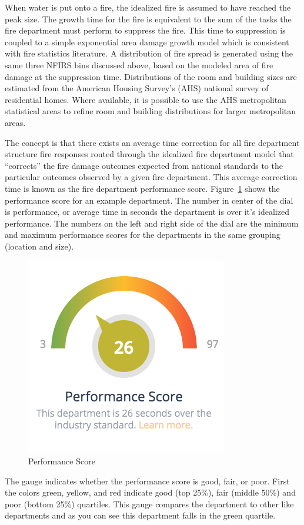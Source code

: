 \documentclass[12pt,oneside]{book}
\begin{document}
When water is put onto a fire, the idealized fire is assumed to have reached the peak size. The growth time for the fire is equivalent to the sum of the tasks the fire department must perform to suppress the fire. This time to suppression is coupled to a simple exponential area damage growth model which is consistent with fire statistics literature. A distribution of fire spread is generated using the same three NFIRS bins discussed above, based on the modeled area of fire damage at the suppression time. Distributions of the room and building sizes are estimated from the American Housing Survey's (AHS) national survey of residential homes. Where available, it is possible to use the AHS metropolitan statistical areas to refine room and building distributions for larger metropolitan areas.

The concept is that there exists an average time correction for all fire department structure fire responses routed through the idealized fire department model that ``corrects'' the fire damage outcomes expected from national standards to the particular outcomes observed by a given fire department. This average correction time is known as the fire department performance score. Figure~\ref{fig:perform} shows the performance score for an example department. The number in center of the dial is performance, or average time in seconds the department is over it's idealized performance. The numbers on the left and right side of the dial are the minimum and maximum performance scores for the departments in the same grouping (location and size).

\begin{figure}[ht!]
\centering
\includegraphics[width=.5\columnwidth]{Figures/performance_score}
\caption{Performance Score}
\label{fig:perform}
\end{figure}

The gauge indicates whether the performance score is good, fair, or poor. First the colors green, yellow, and red indicate good (top 25\%), fair (middle 50\%) and poor (bottom 25\%) quartiles. This gauge compares the department to other like departments and as you can see this department falls in the green quartile. 
\end{document}
